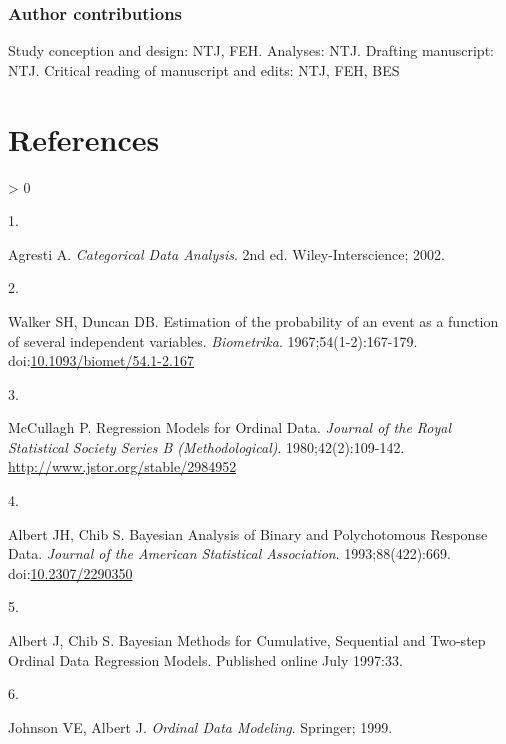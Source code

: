 \documentclass[
]{article}
\newlength{\cslhangindent}
\newlength{\csllabelwidth}
\newenvironment{CSLReferences}[2] %
 {%
  \setlength{\parindent}{0pt}
  \ifodd #1 \everypar{\setlength{\hangindent}{\cslhangindent}}\ignorespaces\fi
  \ifnum #2 > 0
  \setlength{\parskip}{#2\baselineskip}
  \fi
 }%
 {}
\newcommand{\CSLLeftMargin}[1]{\parbox[t]{\csllabelwidth}{#1}}
\newcommand{\CSLRightInline}[1]{\parbox[t]{\linewidth - \csllabelwidth}{#1}\break}
\begin{document}
\hypertarget{author-contributions}{%
\subsubsection{Author contributions}\label{author-contributions}}

Study conception and design: NTJ, FEH. Analyses: NTJ. Drafting manuscript: NTJ. Critical reading of manuscript and edits: NTJ, FEH, BES

\newpage

\hypertarget{references}{%
\section*{References}\label{references}}

\hypertarget{refs}{}
\begin{CSLReferences}{0}{0}
\leavevmode\hypertarget{ref-agresti_categorical_2002}{}%
\CSLLeftMargin{1. }
\CSLRightInline{Agresti A. \emph{Categorical {Data} {Analysis}}. 2nd ed. Wiley-Interscience; 2002.}

\leavevmode\hypertarget{ref-walker_estimation_1967}{}%
\CSLLeftMargin{2. }
\CSLRightInline{Walker SH, Duncan DB. Estimation of the probability of an event as a function of several independent variables. \emph{Biometrika}. 1967;54(1-2):167-179. doi:\href{https://doi.org/10.1093/biomet/54.1-2.167}{10.1093/biomet/54.1-2.167}}

\leavevmode\hypertarget{ref-peter_mccullagh_regression_1980}{}%
\CSLLeftMargin{3. }
\CSLRightInline{McCullagh P. Regression {Models} for {Ordinal} {Data}. \emph{Journal of the Royal Statistical Society Series B (Methodological)}. 1980;42(2):109-142. \url{http://www.jstor.org/stable/2984952}}

\leavevmode\hypertarget{ref-albert_bayesian_1993}{}%
\CSLLeftMargin{4. }
\CSLRightInline{Albert JH, Chib S. Bayesian {Analysis} of {Binary} and {Polychotomous} {Response} {Data}. \emph{Journal of the American Statistical Association}. 1993;88(422):669. doi:\href{https://doi.org/10.2307/2290350}{10.2307/2290350}}

\leavevmode\hypertarget{ref-albert_bayesian_1997}{}%
\CSLLeftMargin{5. }
\CSLRightInline{Albert J, Chib S. Bayesian {Methods} for {Cumulative}, {Sequential} and {Two}-step {Ordinal} {Data} {Regression} {Models}. Published online July 1997:33.}

\leavevmode\hypertarget{ref-johnson_ordinal_1999}{}%
\CSLLeftMargin{6. }
\CSLRightInline{Johnson VE, Albert J. \emph{Ordinal Data Modeling}. Springer; 1999.}


\end{CSLReferences}
\end{document}
